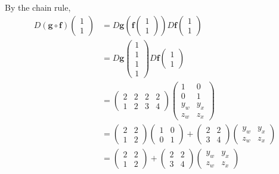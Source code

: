 \documentclass[answers]{exam}
\newcommand{\vf}{\mathbf{f}}
\newcommand{\vg}{\mathbf{g}}
\begin{document}
\begin{questions}
\begin{solution}
        By the chain rule,
        \begin{align*}
            D(\vg\circ\vf)\begin{pmatrix}
                1\\1
            \end{pmatrix} &= D\vg\left(\vf\begin{pmatrix}
                1\\1
            \end{pmatrix}\right) D\vf\begin{pmatrix}
                1\\1
            \end{pmatrix}\\
            &= D\vg\begin{pmatrix}
                1\\1\\1\\1
            \end{pmatrix}D\vf\begin{pmatrix}
                1\\1
            \end{pmatrix}\\
            &= \begin{pmatrix}
                2 & 2 & 2 & 2\\
                1&2&3&4
            \end{pmatrix}\begin{pmatrix}
                1&0\\0&1\\y_w&y_x\\z_w&z_x
            \end{pmatrix}\\
            &= \begin{pmatrix}
                2&2\\1&2
            \end{pmatrix}\begin{pmatrix}
                1&0\\0&1
            \end{pmatrix} + \begin{pmatrix}
                2&2\\3&4
            \end{pmatrix}\begin{pmatrix}
                y_w&y_x\\z_w&z_x
            \end{pmatrix}\\
            &=\begin{pmatrix}
                2&2\\1&2
            \end{pmatrix}+ \begin{pmatrix}
                2&2\\3&4
            \end{pmatrix}\begin{pmatrix}
                y_w&y_x\\z_w&z_x
            \end{pmatrix}
        \end{align*}


\end{solution}
\end{questions}
\end{document}
